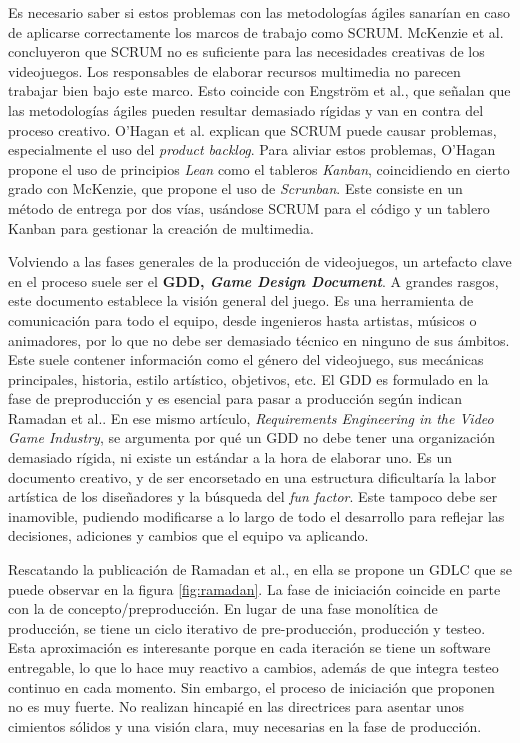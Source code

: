 Es necesario saber si estos problemas con las metodologías ágiles sanarían en caso de aplicarse correctamente los marcos de trabajo como SCRUM. McKenzie et al.\cite{mckenzie} concluyeron que SCRUM no es suficiente para las necesidades creativas de los videojuegos. Los responsables de elaborar recursos multimedia no parecen trabajar bien bajo este marco. Esto coincide con Engström et al.\cite{ENGSTROM201810}, que señalan que las metodologías ágiles pueden resultar demasiado rígidas y van en contra del proceso creativo. O'Hagan et al.\cite{ohagan} explican que SCRUM puede causar problemas, especialmente el uso del \textit{product backlog}. Para aliviar estos problemas, O'Hagan propone el uso de principios \textit{Lean} como el tableros \textit{Kanban}, coincidiendo en cierto grado con McKenzie, que propone el uso de \textit{Scrunban}. Este consiste en un método de entrega por dos vías, usándose SCRUM para el código y un tablero Kanban para gestionar la creación de multimedia.

Volviendo a las fases generales de la producción de videojuegos, un artefacto clave en el proceso suele ser el \textbf{GDD, \textit{Game Design Document}}. A grandes rasgos, este documento establece la visión general del juego. Es una herramienta de comunicación para todo el equipo, desde ingenieros hasta artistas, músicos o animadores, por lo que no debe ser demasiado técnico en ninguno de sus ámbitos. Este suele contener información como el género del videojuego, sus mecánicas principales, historia, estilo artístico, objetivos, etc. El GDD es formulado en la fase de preproducción y es esencial para pasar a producción según indican Ramadan et al.\cite{ramadan}. En ese mismo artículo, \textit{Requirements Engineering in the Video Game Industry}, se argumenta por qué un GDD no debe tener una organización demasiado rígida, ni existe un estándar a la hora de elaborar uno. Es un documento creativo, y de ser encorsetado en una estructura dificultaría la labor artística de los diseñadores y la búsqueda del \textit{fun factor}. Este tampoco debe ser inamovible, pudiendo modificarse a lo largo de todo el desarrollo para reflejar las decisiones, adiciones y cambios que el equipo va aplicando.

Rescatando la publicación de Ramadan et al.\cite{ramadan}, en ella se propone un GDLC que se puede observar en la figura \ref{fig:ramadan}. La fase de iniciación coincide en parte con la de concepto/preproducción. En lugar de una fase monolítica de producción, se tiene un ciclo iterativo de pre-producción, producción y testeo. Esta aproximación es interesante porque en cada iteración se tiene un software entregable, lo que lo hace muy reactivo a cambios, además de que integra testeo continuo en cada momento. Sin embargo, el proceso de iniciación que proponen no es muy fuerte. No realizan hincapié en las directrices para asentar unos cimientos sólidos y una visión clara, muy necesarias en la fase de producción.

